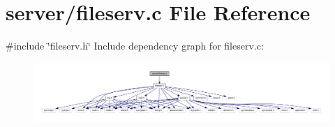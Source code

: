 \section{server/fileserv.c File Reference}
\label{fileserv_8c}
{\ttfamily \#include \char`\"{}fileserv.\+h\char`\"{}}\newline
Include dependency graph for fileserv.\+c\+:\nopagebreak
\begin{figure}[H]
\begin{center}
\leavevmode
\includegraphics[width=350pt]{fileserv_8c__incl}
\end{center}
\end{figure}
